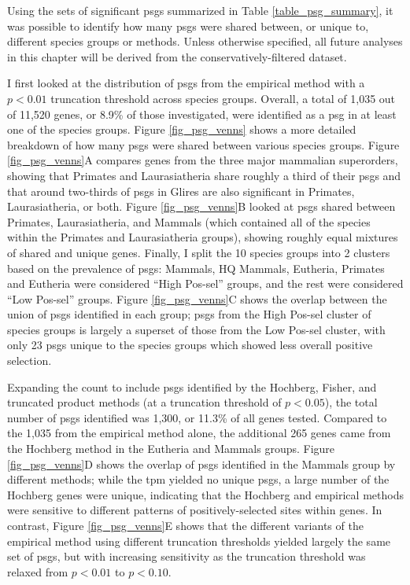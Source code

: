 Using the sets of significant \acp{psg} summarized in Table
\ref{table_psg_summary}, it was possible to identify how many
\acp{psg} were shared between, or unique to, different species groups
or methods. Unless otherwise specified, all future analyses in this
chapter will be derived from the conservatively-filtered dataset.

I first looked at the distribution of \acp{psg} from the empirical
method with a $p<0.01$ truncation threshold across species
groups. Overall, a total of 1,035 out of 11,520 genes, or 8.9\% of
those investigated, were identified as a \ac{psg} in at least one of
the species groups. Figure \ref{fig_psg_venns} shows a more detailed
breakdown of how many \acp{psg} were shared between various species
groups. Figure \ref{fig_psg_venns}A compares genes from the three
major mammalian superorders, showing that Primates and Laurasiatheria
share roughly a third of their \acp{psg} and that around two-thirds of
\acp{psg} in Glires are also significant in Primates, Laurasiatheria,
or both. Figure \ref{fig_psg_venns}B looked at \acp{psg} shared
between Primates, Laurasiatheria, and Mammals (which contained all of
the species within the Primates and Laurasiatheria groups), showing
roughly equal mixtures of shared and unique genes. Finally, I split
the 10 species groups into 2 clusters based on the prevalence of
\acp{psg}: Mammals, HQ Mammals, Eutheria, Primates and Eutheria were
considered ``High Pos-sel'' groups, and the rest were considered ``Low
Pos-sel'' groups. Figure \ref{fig_psg_venns}C shows the overlap
between the union of \acp{psg} identified in each group; \acp{psg}
from the High Pos-sel cluster of species groups is largely a superset
of those from the Low Pos-sel cluster, with only 23 \acp{psg} unique
to the species groups which showed less overall positive selection.

Expanding the count to include \acp{psg} identified by the Hochberg,
Fisher, and truncated product methods (at a truncation threshold of
$p<0.05$), the total number of \acp{psg} identified was 1,300, or
11.3\% of all genes tested. Compared to the 1,035 from the empirical
method alone, the additional 265 genes came from the Hochberg method
in the Eutheria and Mammals groups. Figure \ref{fig_psg_venns}D shows
the overlap of \acp{psg} identified in the Mammals group by different
methods; while the \ac{tpm} yielded no unique \acp{psg}, a large
number of the Hochberg genes were unique, indicating that the Hochberg
and empirical \pv methods were sensitive to different patterns of
positively-selected sites within genes. In contrast, Figure
\ref{fig_psg_venns}E shows that the different variants of the
empirical method using different truncation thresholds yielded largely
the same set of \acp{psg}, but with increasing sensitivity as the
truncation threshold was relaxed from $p<0.01$ to $p<0.10$.

